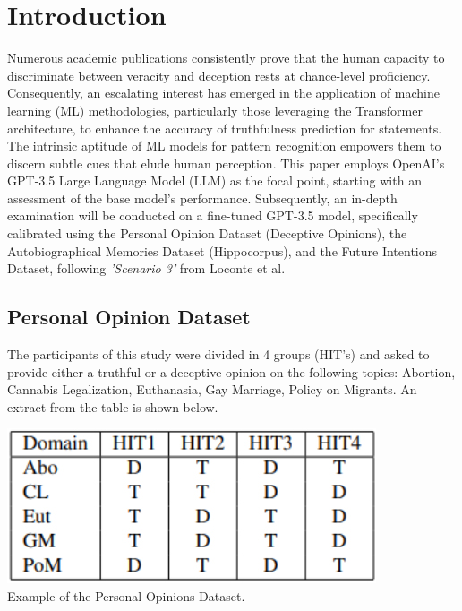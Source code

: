 \documentclass[10pt,twocolumn,letterpaper]{article}
\begin{document}
\section{Introduction}
Numerous academic publications consistently prove that the human capacity to discriminate 
between veracity and deception rests at chance-level proficiency. Consequently, an escalating 
interest has emerged in the application of machine learning (ML) methodologies, particularly 
those leveraging the Transformer architecture, to enhance the accuracy of truthfulness prediction for statements. 
The intrinsic aptitude of ML models for pattern recognition empowers them to discern subtle cues 
that elude human perception. This paper employs OpenAI's GPT-3.5 Large Language Model (LLM) 
as the focal point, starting with an assessment of the base model's performance. Subsequently, 
an in-depth examination will be conducted on a fine-tuned GPT-3.5 model, specifically calibrated using the 
Personal Opinion Dataset (Deceptive Opinions), the Autobiographical Memories Dataset (Hippocorpus), and the 
Future Intentions Dataset, following \textit{'Scenario 3'} from Loconte et al.\cite{Loconte} \\

\subsection{Personal Opinion Dataset}

The participants of this study were divided in 4 groups (HIT’s) and asked to provide either 
a truthful or a deceptive opinion on the following topics: Abortion, Cannabis Legalization, Euthanasia, Gay Marriage, Policy on Migrants.
An extract from the table is shown below. \\

\begin{center}
\includegraphics[scale=0.40]{img/pers_op_dataset.jpg} \\
\small {Example of the Personal Opinions Dataset.}
\end{center}
\end{document}
